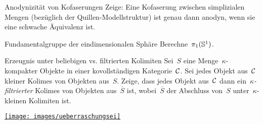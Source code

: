 \documentclass{uebblatt}
\begin{document}
\begin{aufgabe}{Anodynizität von Kofaserungen}
Zeige: Eine Kofaserung zwischen simplizialen Mengen (bezüglich der
Quil\-len-Mo\-dell\-struk\-tur) ist genau dann anodyn, wenn sie eine schwache
Äquivalenz ist.
\end{aufgabe}

\begin{aufgabe}{Fundamentalgruppe der eindimensionalen Sphäre}
Berechne~$\pi_1(\mathbb{S}^1)$.
\end{aufgabe}

\begin{aufgabe}{Erzeugnis unter beliebigen vs. filtrierten Kolimiten}
Sei~$S$ eine Menge~$\kappa$-kompakter Objekte in einer kovollständigen
Kategorie~$\mathcal{C}$. Sei jedes Objekt aus~$\mathcal{C}$ kleiner Kolimes von Objekten aus~$S$.
Zeige, dass jedes Objekt aus~$\mathcal{C}$ dann ein~\emph{$\kappa$-fil\-trierter} Kolimes
von Objekten aus~$\overline{S}$ ist, wobei~$\overline{S}$ der Abschluss von~$S$
unter~$\kappa$-kleinen Kolimiten ist.
\end{aufgabe}

\centering
\href{http://www.4teachers.de/?action=keywordsearch&searchtype=images&searchstring=Kinder%C3%BCberraschung}{\texttt{[image: images/ueberraschungsei]}}
\par
\end{document}
